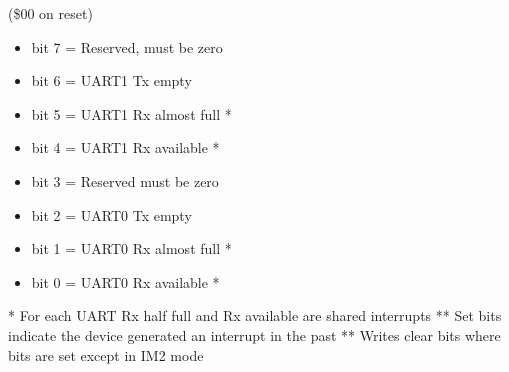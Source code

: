 (\$00 on reset)
\begin{itemize}
\item bit 7 = Reserved, must be zero
\item bit 6 = UART1 Tx empty
\item bit 5 = UART1 Rx almost full *
\item bit 4 = UART1 Rx available *
\item bit 3 = Reserved must be zero
\item bit 2 = UART0 Tx empty
\item bit 1 = UART0 Rx almost full *
\item bit 0 = UART0 Rx available *
\end{itemize}
* For each UART Rx half full and Rx available are shared interrupts
** Set bits indicate the device generated an interrupt in the past
** Writes clear bits where bits are set except in IM2 mode

